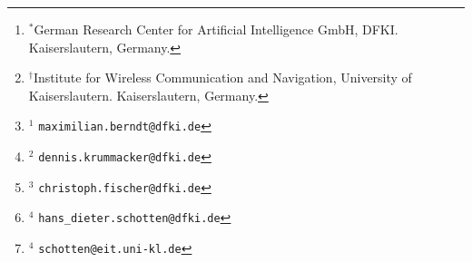 %
\author{%
Maximilian Berndt$^{1,*}$,
Dennis Krummacker$^{2,*}$,
Christoph Fischer$^{3,*}$
and
Hans Dieter Schotten$^{4,*\dag}$%
%
\thanks{%
$^{*}$German Research Center for Artificial Intelligence GmbH, DFKI.
Kaiserslautern, Germany.%
}%
%
\thanks{$^{\dag}$Institute for Wireless Communication and Navigation, University of Kaiserslautern.
Kaiserslautern, Germany.%
}%
%
\thanks{%
$^{1}$%
{\tt\small maximilian.berndt@dfki.de}%
}%
%
\thanks{%
$^{2}$%
{\tt\small dennis.krummacker@dfki.de}%
}%
%
\thanks{%
$^{3}$%
{\tt\small christoph.fischer@dfki.de}%
}%
%
\thanks{%
$^{4}$%
{\tt\small hans\_dieter.schotten@dfki.de}%
}%
%
\thanks{%
$^{4}$%
{\tt\small schotten@eit.uni-kl.de}%
}%
}%
%
